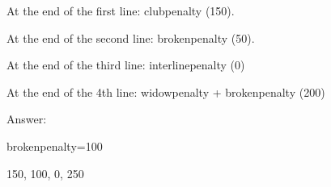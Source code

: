 \item{}At the end of the first line: clubpenalty (150).
\item{}At the end of the second line: brokenpenalty (50).
\item{}At the end of the third line: interlinepenalty (0)
\item{}At the end of the 4th line: widowpenalty + brokenpenalty (200)

Answer:

brokenpenalty=100

150, 100, 0, 250

\bye

